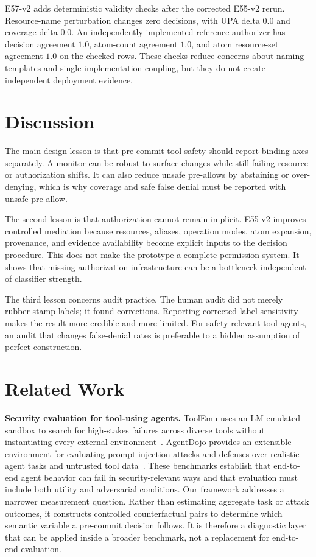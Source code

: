 \documentclass[10pt,twocolumn]{article}
\begin{document}
E57-v2 adds deterministic validity checks after the corrected E55-v2 rerun. Resource-name perturbation changes zero decisions, with UPA delta $0.0$ and coverage delta $0.0$. An independently implemented reference authorizer has decision agreement $1.0$, atom-count agreement $1.0$, and atom resource-set agreement $1.0$ on the checked rows. These checks reduce concerns about naming templates and single-implementation coupling, but they do not create independent deployment evidence.

\section{Discussion}

The main design lesson is that pre-commit tool safety should report binding axes separately. A monitor can be robust to surface changes while still failing resource or authorization shifts. It can also reduce unsafe pre-allows by abstaining or over-denying, which is why coverage and safe false denial must be reported with unsafe pre-allow.

The second lesson is that authorization cannot remain implicit. E55-v2 improves controlled mediation because resources, aliases, operation modes, atom expansion, provenance, and evidence availability become explicit inputs to the decision procedure. This does not make the prototype a complete permission system. It shows that missing authorization infrastructure can be a bottleneck independent of classifier strength.

The third lesson concerns audit practice. The human audit did not merely rubber-stamp labels; it found corrections. Reporting corrected-label sensitivity makes the result more credible and more limited. For safety-relevant tool agents, an audit that changes false-denial rates is preferable to a hidden assumption of perfect construction.

\section{Related Work}

\textbf{Security evaluation for tool-using agents.}
ToolEmu uses an LM-emulated sandbox to search for high-stakes failures across diverse tools without instantiating every external environment~\cite{toolemu}. AgentDojo provides an extensible environment for evaluating prompt-injection attacks and defenses over realistic agent tasks and untrusted tool data~\cite{agentdojo}. These benchmarks establish that end-to-end agent behavior can fail in security-relevant ways and that evaluation must include both utility and adversarial conditions. Our framework addresses a narrower measurement question. Rather than estimating aggregate task or attack outcomes, it constructs controlled counterfactual pairs to determine which semantic variable a pre-commit decision follows. It is therefore a diagnostic layer that can be applied inside a broader benchmark, not a replacement for end-to-end evaluation.
\end{document}
